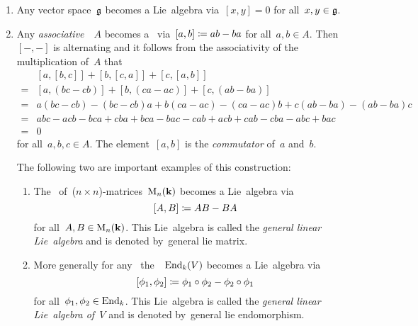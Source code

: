 \begin{examples}
  \leavevmode
  \begin{enumerate}
    \item
      Any vector space~$\mathfrak{g}$ becomes a Lie~algebra via~$[x,y] = 0$ for all~$x,y \in \mathfrak{g}$.
    \item
      Any \emph{associative}~{\algebra{$\kf$}}~$A$ becomes a~{} via~$[a,b] \coloneqq ab - ba$ for all~$a, b \in A$.
      Then~$[-, -]$ is alternating and it follows from the associativity of the multiplication of~$A$ that
      \begin{align*}
         {}&  [a,[b,c]] + [b,[c,a]] + [c,[a,b]] \\
        ={}&  [a, (bc-cb)] + [b, (ca-ac)] + [c, (ab-ba)] \\
        ={}&  a(bc-cb)-(bc-cb)a + b(ca-ac) - (ca-ac)b + c(ab-ba) - (ab-ba)c \\
        ={}&  abc - acb - bca + cba + bca - bac - cab + acb + cab - cba - abc + bac \\
        ={}&  0
    \end{align*}
    for all~$a, b, c \in A$.
    The element~$[a,b]$ is the \emph{commutator} of~$a$ and~$b$.
   
    The following two are important examples of this construction:
    \begin{enumerate}
      \item
        The~{\algebra{$\kf$}} of~($n \times n$)-matrices~$\operatorname{M}_n(\mathbf{k})$ becomes a Lie~algebra via
        \[
          [A,B]
          \coloneqq
          AB - BA
        \]
        for all~$A, B \in \operatorname{M}_n(\mathbf{k})$.
        This Lie~algebra is called the \emph{general linear Lie~algebra} and is denoted by~\gls*{general lie matrix}.
      \item
        More generally for any~{\vectorspace{$\kf$}} the~{\algebra{$\kf$}}~$\operatorname{End}_k(V)$ becomes a Lie~algebra via
        \[
          [\phi_1, \phi_2]
          \coloneqq
          \phi_1 \circ \phi_2 - \phi_2 \circ \phi_1
        \]
        for all~$\phi_1, \phi_2 \in \operatorname{End}_k$.
        This Lie~algebra is called the \emph{general linear Lie~algebra of~$V$} and is denoted by~\gls*{general lie endomorphism}.
    \end{enumerate}
  \end{enumerate}
\end{examples}


